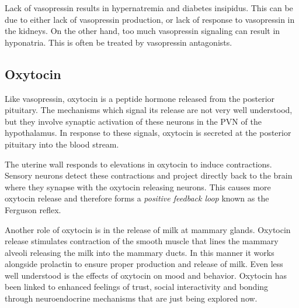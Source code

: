 \documentclass{tufte-handout}
\begin{document}
  Lack of vasopressin results in hypernatremia and diabetes insipidus.  This can be due to either lack of vasopressin production, or lack of response to vasopressin in the kidneys.  On the other hand, too much vasopressin signaling can result in hyponatria.  This is often be treated by vasopressin antagonists.

\subsection{Oxytocin}

Like vasopressin, oxytocin is a peptide hormone released from the posterior pituitary.  The mechanisms which signal its release are not very well understood, but they involve synaptic activation of these neurons in the PVN of the hypothalamus.  In response to these signals, oxytocin is secreted at the posterior pituitary into the blood stream.

  The uterine wall responds to elevations in oxytocin to induce contractions.  Sensory neurons detect these contractions and project directly back to the brain where they synapse with the oxytocin releasing neurons.  This causes more oxytocin release and therefore forms a \emph{positive feedback loop} known as the Ferguson reflex\cite{Ferguson1941}.

Another role of oxytocin is in the release of milk at mammary glands.  Oxytocin release stimulates contraction of the smooth muscle that lines the mammary alveoli releasing the milk into the mammary ducts.  In this manner it works alongside prolactin to ensure proper production and release of milk.  Even less well understood is the effects of oxytocin on mood and behavior.  Oxytocin has been linked to enhanced feelings of trust, social interactivity and bonding through neuroendocrine mechanisms that are just being explored now.

\listoffigures
\listoftables



\end{document}
